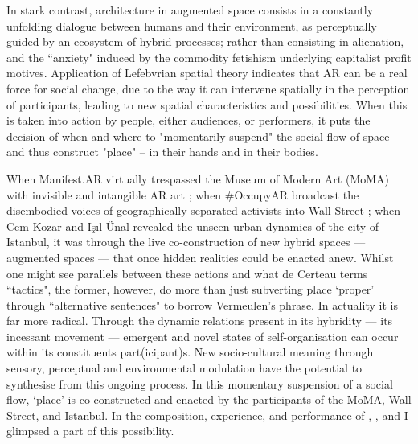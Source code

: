 In stark contrast, architecture in augmented space consists in a constantly unfolding dialogue between humans and their environment, as perceptually guided by an ecosystem of hybrid processes; rather than consisting in alienation, and the ``anxiety" induced by the commodity fetishism underlying capitalist profit motives. Application of Lefebvrian spatial theory indicates that AR can be a real force for social change, due to the way it can intervene spatially in the perception of participants, leading to new spatial characteristics and possibilities. When this is taken into action by people, either audiences, or performers, it puts the decision of when and where to "momentarily suspend" the social flow of space -- and thus construct "place" -- in their hands and in their bodies.

When Manifest.AR virtually trespassed the Museum of Modern Art (MoMA) with invisible and intangible AR art \citep{veenhof2010}; when \#OccupyAR broadcast the disembodied voices of geographically separated activists into Wall Street \citep{skwarek2018}; when Cem Kozar and Işıl Ünal \citeyearpar{thiel2011,thiel2018} revealed the unseen urban dynamics of the city of Istanbul, it was through the live co-construction of new hybrid spaces — augmented spaces — that once hidden realities could be enacted anew. Whilst one might see parallels between these actions and what de Certeau terms ``tactics", the former, however, do more than just subverting place `proper' through ``alternative sentences" to borrow Vermeulen's phrase. In actuality it is far more radical. Through the dynamic relations present in its hybridity — its incessant movement — emergent and novel states of self-organisation can occur within its constituents part(icipant)s. New socio-cultural meaning through sensory, perceptual and environmental modulation have the potential to synthesise from this ongoing process. In this momentary suspension of a social flow, `place' is co-constructed and enacted by the participants of the MoMA, Wall Street, and Istanbul. In the composition, experience, and performance of \textit{}, \textit{}, and \textit{} I glimpsed a part of this possibility.



